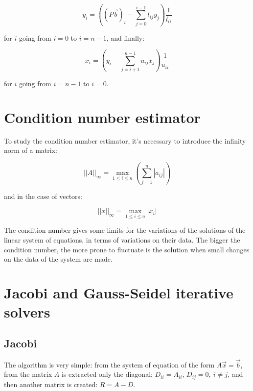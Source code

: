 \documentclass[paper=a4, fontsize=11pt]{scrartcl} %
\numberwithin{equation}{section} %
\numberwithin{figure}{section} %
\numberwithin{table}{section} %
\begin{document}
\begin{equation}
y_{i} = \left( (P\vec{b})_{i}-\sum_{j=0}^{i-1}l_{ij}y_{j} \right)\frac{1}{l_{ii}}
\end{equation}

for $i$ going from $i=0$ to $i=n-1$, and finally:

\begin{equation}
x_{i} = \left( y_{i} - \sum_{j=i+1}^{n-1}u_{ij}x_{j} \right) \frac{1}{u_{ii}}
\end{equation}

for $i$ going from $i=n-1$ to $i=0$.



\section{Condition number estimator}

To study the condition number estimator, it's necessary to introduce the infinity norm of a matrix:

\begin{equation}
||A||_{\infty} = \max_{1\le i \le n}\left( \sum_{j=1}^{n}|a_{ij}| \right)
\end{equation}

and in the case of vectors:

\begin{equation}
||x||_{\infty} = \max_{1 \le i \le n}|x_{i}|
\end{equation}


The condition number gives some limits for the variations of the solutions of the linear system of equations, in terms of variations on their data. The bigger the condition number, the more prone to fluctuate is the solution when small changes on the data of the system are made.


\section{Jacobi and Gauss-Seidel iterative solvers}

\subsection{Jacobi}

The algorithm is very simple: from the system of equation of the form $A\vec{x} = \vec{b}$, from the matrix $A$ is extracted only the diagonal: $D_{ii} = A_{ii}$, $D_{ij} = 0, \ i\ne j$, and then another matrix is created: $R = A-D$.
\end{document}
